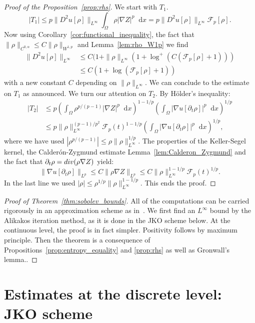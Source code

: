 \documentclass[a4paper,twosided, 11pt]{article}
\renewcommand{\color}[2][]{}
\newcommand {\Div}  { {\rm div} }
\newcommand {\p}   {\partial}
\theoremstyle{plain}
\theoremstyle{remark}
\newcommand{\diff}{\mathop{}\!\mathrm{d}}
\numberwithin{equation}{section}
\begin{document}
\begin{proof}[Proof of the Proposition~\ref{prop:rhs}]
We start with $T_1$. 
$$
|T_1| \le p \|D^{2} u[\rho]\|_{L^{\infty}}\int_{\Omega} \rho |\nabla Z|^p\diff x = p\|D^{2} u[\rho]\|_{L^{\infty}}\mathcal{F}_{p}[\rho] . 
$$
Now using Corollary~\ref{cor:functional_inequality}, the fact that $\|\rho\|_{C^{0,\alpha}}\le C \|\rho\|_{W^{1,p}}$  and Lemma~\ref{lem:rho_W1p} we find
\begin{align*}
\|D^{2} u[\rho]\|_{L^{\infty}}&\le C(1+\|\rho\|_{L^{\infty}}( 1 + \log^{+}(C(\mathcal{F}_{p}[\rho]+1)))\\
&\le C ( 1+ \log(\mathcal{F}_{p}[\rho]+1))
\end{align*}
with a new constant $C$ depending on $\|\rho\|_{L^{\infty}}$. We can conclude to the estimate on $T_1$ as announced.  We turn our attention on $T_2$.  By Hölder's inequality:
\begin{align*}
|T_2| &\le p\left(\int_{\Omega} \rho^{p/(p-1)}|\nabla Z|^p \diff x\right)^{1-1/p}\left(\int_{\Omega} |\nabla u[\p_t\rho]|^{p}\diff x\right)^{1/p}\\
&\le p\|\rho\|^{(p-1)/p^2}_{L^{\infty}} \mathcal{F}_{p}(t)^{1-1/p}\left(\int_{\Omega} |\nabla u[ \p_t\rho]|^{p}\diff x\right)^{1/p},
\end{align*}
where we have used $|\rho^{p/(p-1)}|\le \rho \|\rho\|^{1/p}_{L^{\infty}}$. The properties of the Keller-Segel kernel, the Calderón-Zygmund estimate Lemma~\ref{lem:Calderon_Zygmund} and the fact that $\p_t \rho = \Div(\rho\nabla Z)$ yield:
$$
\|\nabla u[\p_t \rho]\|_{L^{p}}\le C\|\rho\nabla Z\|_{L^{p}}\le C \|\rho\|^{1-1/p}_{L^{\infty}}\mathcal{F}_{p}(t)^{1/p}. 
$$
In the last line we used $|\rho|\le \rho^{1/p} \|\rho\|^{1-1/p}_{L^{\infty}}$. This ends the proof. 
\end{proof}

\begin{proof}[Proof of Theorem~\ref{thm:sobolev_bounds}]
{\color{blue}All of the computations can be carried rigorously in an approximation scheme as in~\cite{SUGIYAMA2006333}. We first find an $L^{\infty}$ bound by the Alikakos iteration method, as it is done in the JKO scheme below. At the continuous level, the proof is in fact simpler. Positivity follows by maximum principle. Then the theorem is a consequence of Propositions~\ref{prop:entropy_equality} and \ref{prop:rhs} as well as Gronwall's lemma.}. 


\end{proof}

\section{Estimates at the discrete level: JKO scheme}\label{sect:JKO}
\end{document}
